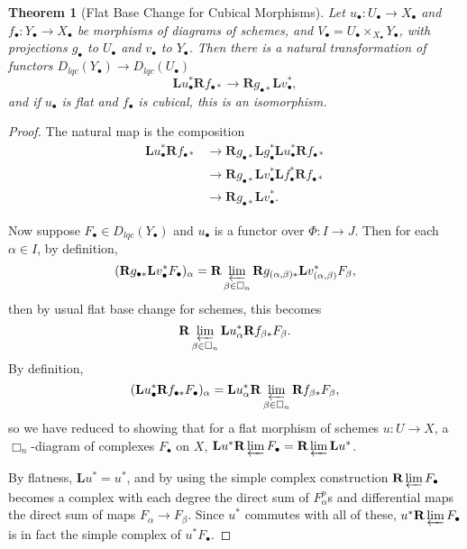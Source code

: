 \documentclass[proquest]{uwthesis}[2014/11/13]
\newtheorem{theorem}{Theorem}[section]
\theoremstyle{definition}
\newcommand{\bL}{\textbf{L}}
\newcommand{\bR}{\textbf{R}}
\begin{document}
\begin{theorem}[Flat Base Change for Cubical Morphisms]
	\label{thm:flatbasechange}
	Let $u_\bullet : U_\bullet \rightarrow X_\bullet$ and $f_\bullet : Y_\bullet \rightarrow X_\bullet$ be morphisms of diagrams of schemes, and $V_\bullet = U_\bullet \times_{X_\bullet} Y_\bullet$, with projections $g_\bullet$ to $U_\bullet$ and $v_\bullet$ to $Y_\bullet$.
	Then there is a natural transformation of functors $D_{lqc}(Y_\bullet) \rightarrow D_{lqc}(U_\bullet)$
	\[
		\bL u_\bullet^* \bR f_{\bullet *} \rightarrow \bR g_{\bullet *} \bL v_\bullet^*,
	\]
	and if $u_\bullet$ is flat and $f_\bullet$ is cubical, this is an isomorphism.
\end{theorem}
\begin{proof}
	The natural map is the composition
	\begin{align*}
		\bL u_\bullet^* \bR f_{\bullet *} &\rightarrow \bR g_{\bullet *} \bL g_\bullet^* \bL u_\bullet^* \bR f_{\bullet *} \\
		&\rightarrow \bR g_{\bullet *} \bL v_\bullet^* \bL f_\bullet^* \bR f_{\bullet *} \\
		&\rightarrow \bR g_{\bullet *} \bL v_\bullet^*.
	\end{align*}
	
	Now suppose $F_\bullet \in D_{lqc}(Y_\bullet)$ and $u_\bullet$ is a functor over $\Phi : I \rightarrow J$.
	Then for each $\alpha \in I$, by definition,
	\[
		(\bR g_{\bullet *} \bL v_\bullet^* F_\bullet)_\alpha = \bR \varprojlim_{\beta \in \Box_n} \bR g_{(\alpha, \beta) *} \bL v_{(\alpha, \beta)}^* F_\beta,
	\]
	then by usual flat base change for schemes, this becomes
	\[
		 \bR \varprojlim_{\beta \in \Box_n} \bL u_{\alpha}^*  \bR f_{\beta *} F_\beta.
	\]
	By definition,
	\[
		(\bL u_\bullet^* \bR f_{\bullet *} F_\bullet)_\alpha = \bL u_\alpha^* \bR \varprojlim_{\beta \in \Box_n} \bR f_{\beta *} F_\beta,
	\]
	so we have reduced to showing that for a flat morphism of schemes $u : U \rightarrow X$, a $\Box_n$-diagram of complexes $F_\bullet$ on $X$, $\bL u^* \bR \varprojlim F_\bullet = \bR \varprojlim \bL u^*$.
	
	By flatness, $\bL u^* = u^*$, and by using the simple complex construction $\bR \varprojlim F_\bullet$ becomes a complex with each degree the direct sum of $F_\alpha^p$s and differential maps the direct sum of maps $F_\alpha \rightarrow F_\beta$.
	Since $u^*$ commutes with all of these, $u^* \bR \varprojlim F_\bullet$ is in fact the simple complex of $u^* F_\bullet$.
\end{proof}
\end{document}

